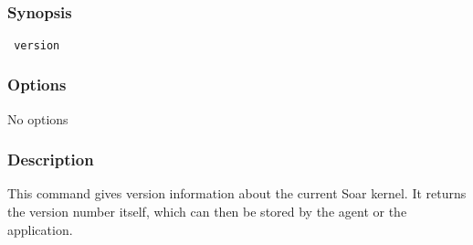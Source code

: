 \subsection{}
\label{version}
\subsubsection*{Synopsis}
\begin{verbatim}
 version
\end{verbatim}
\subsubsection*{Options}
 No options 
\subsubsection*{Description}
 This command gives version information about the current Soar kernel. It returns the version number itself, which can then be stored by the agent or the application. 
